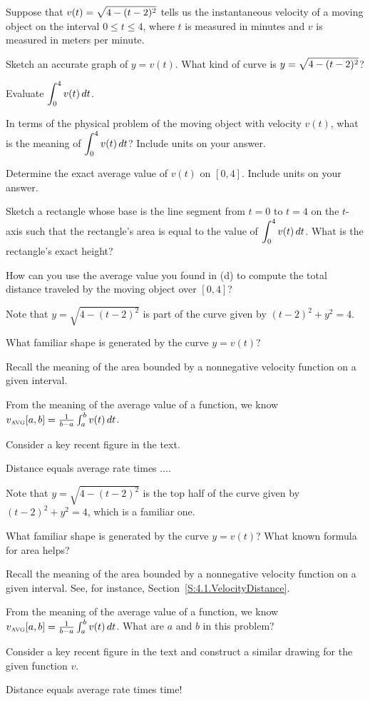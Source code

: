 \begin{activity} \label{A:4.7.av}  Suppose that $\displaystyle v(t) = \sqrt{4-(t-2)^2}$ tells us the instantaneous velocity of a moving object on the interval $0 \le t \le 4$, where $t$ is measured in minutes and $v$ is measured in meters per minute.
\ba
\item Sketch an accurate graph of $y = v(t)$.  What kind of curve is $\displaystyle y = \sqrt{4-(t-2)^2}$?
\item Evaluate $\displaystyle \int_0^4 v(t) \, dt$.
\item In terms of the physical problem of the moving object with velocity $v(t)$, what is the meaning of $\displaystyle \int_0^4 v(t) \, dt$?  Include units on your answer.
\item Determine the exact average value of $v(t)$ on $[0,4]$.  Include units on your answer.
\item Sketch a rectangle whose base is the line segment from $t=0$ to $t = 4$ on the $t$-axis such that the rectangle's area is equal to the value of $\displaystyle \int_0^4 v(t) \, dt$.  What is the rectangle's exact height?
\item How can you use the average value you found in (d) to compute the total distance traveled by the moving object over $[0,4]$?
\ea
\end{activity}
\begin{smallhint}
\ba
	\item Note that $y = \sqrt{4-(t-2)^2}$ is part of the curve given by $(t-2)^2 + y^2 = 4$.
	\item What familiar shape is generated by the curve $y = v(t)$?
	\item Recall the meaning of the area bounded by a nonnegative velocity function on a given interval.
	\item From the meaning of the average value of a function, we know $v_{\mbox{\tiny{AVG}}}[a,b] = \frac{1}{b-a}  \int_a^b v(t) \, dt$.
	\item Consider a key recent figure in the text.
	\item Distance equals average rate times $\ldots$.
\ea
\end{smallhint}
\begin{bighint}
\ba
	\item Note that $y = \sqrt{4-(t-2)^2}$ is the top half of the curve given by $(t-2)^2 + y^2 = 4$, which is a familiar one.
	\item What familiar shape is generated by the curve $y = v(t)$?  What known formula for area helps?
	\item Recall the meaning of the area bounded by a nonnegative velocity function on a given interval.  See, for instance, Section~\ref{S:4.1.VelocityDistance}.
	\item From the meaning of the average value of a function, we know $v_{\mbox{\tiny{AVG}}}[a,b] = \frac{1}{b-a}  \int_a^b v(t) \, dt$.  What are $a$ and $b$ in this problem?
	\item Consider a key recent figure in the text and construct a similar drawing for the given function $v$.
	\item Distance equals average rate times time!
\ea
\end{bighint}
